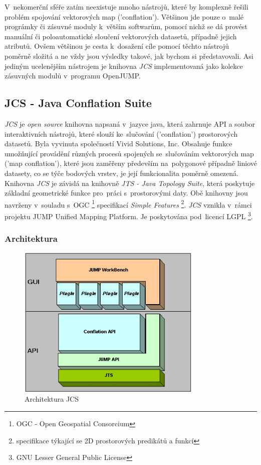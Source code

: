 V~nekomerční sféře zatím neexistuje mnoho nástrojů, které by komplexně řešili problém spojování vektorových map ('conflation'). Většinou jde pouze o~malé prográmky či
zásuvné moduly k~větším softwarům, pomocí nichž se dá provést manuální či poloautomatické sloučení vektorových datasetů, případně jejich atributů. Ovšem většinou je
cesta k~dosažení cíle pomocí těchto nástrojů poměrně složitá a ne vždy jsou výsledky takové, jak bychom si představovali. Asi jediným ucelenějším nástrojem je knihovna
\textit{JCS} implementovaná jako kolekce zásuvných modulů v~programu OpenJUMP.

\subsection{JCS - Java Conflation Suite}

\textit{JCS} je \textit{open source} knihovna napsaná v~jazyce java, která zahrnuje API a soubor interaktivních nástrojů, které slouží ke~slučování ('conflation') 
prostorových datasetů. Byla vyvinuta společností Vivid Solutions, Inc. Obsahuje funkce umožňující provádění různých procesů spojených se~slučováním vektorových map 
('map conflation'), které jsou zaměřeny především na~polygonové případně liniové datasety, co se týče bodových vrstev, je její funkcionalita poměrně omezená. 
Knihovna \textit{JCS} je závislá na knihovně \textit{JTS - Java Topology Suite}, která poskytuje základní geometrické funkce pro~práci s~prostorovými
 daty. Obě knihovny jsou navrženy v~souladu s~OGC \footnote{OGC - Open Geospatial Consorcium} specifikací \textit{Simple Features} \footnote{specifikace týkající se 2D 
prostorových predikátů a funkcí}. \textit{JCS} vznikla v~rámci projektu JUMP Unified Mapping Platform. Je poskytována pod~licencí LGPL \footnote{GNU Lesser General Public 
License}.

\subsubsection{Architektura}
\label{jcspic}
  \begin{figure}[hbt]
    \centering
      \includegraphics[width=250pt]{./pictures/JCS_Architecture.png}
      \caption{Architektura JCS}
      \label{fig:architektura}
  \end{figure}


